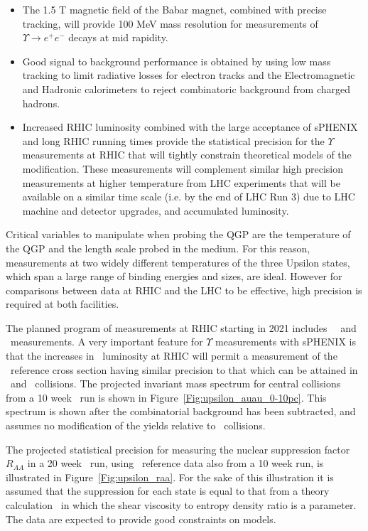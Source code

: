 \begin{itemize}

\item The 1.5 T magnetic field of the Babar magnet, combined with precise tracking, will 
provide 100 MeV mass resolution for measurements of $\Upsilon \rightarrow e^+e^-$ decays
at mid rapidity.

\item Good signal to background performance is obtained by using low mass tracking to limit 
radiative losses for electron tracks and the Electromagnetic and Hadronic calorimeters to 
reject combinatoric background from charged hadrons.

\item Increased RHIC luminosity combined with the large acceptance of sPHENIX
and long RHIC running times provide the statistical precision for the $\Upsilon$ measurements at RHIC that will
tightly constrain theoretical models of the modification. These measurements will 
complement similar high precision measurements at higher temperature from LHC 
experiments that will be available on a similar time scale (i.e. by the end of LHC Run 3) 
due to LHC machine and detector upgrades, and accumulated luminosity.

\end{itemize}

Critical variables to manipulate when probing the QGP are the temperature of
the QGP and the length scale probed in the medium. For this reason, measurements 
at two widely different temperatures of the three Upsilon states, which span a large range of 
binding energies and sizes, are ideal. However for comparisons between data at RHIC and the LHC
 to be effective, high precision is required at both facilities.

The planned program of measurements at RHIC starting in 2021 includes \pp\,
\pAu\ and \AuAu\ measurements. A very important feature for $\Upsilon$ 
measurements with sPHENIX is that the increases in \pp\ luminosity at RHIC will permit a
measurement of the \pp\ reference cross section having similar precision to that which can be
attained in \AuAu\ and \pAu\ collisions. The projected invariant mass spectrum for central collisions
from a 10 week \AuAu\ run is shown in Figure~\ref{Fig:upsilon_auau_0-10pc}. This spectrum is shown
after the combinatorial background has been subtracted, and assumes no modification of the yields relative
to \pp\ collisions. 


The projected statistical precision for measuring the nuclear suppression factor $R_{AA}$ in a 20 week \AuAu\ run, using \pp\
reference data also from a 10 week run, is illustrated in Figure~\ref{Fig:upsilon_raa}. 
For the sake of this illustration it is assumed that the suppression for each state
is equal to that from a theory calculation~\cite{Strickland:2011aa} in which the shear viscosity to
entropy density ratio is a parameter. The data are expected to provide good constraints on models.

